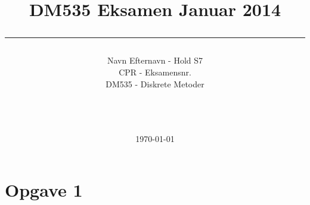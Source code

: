 \documentclass[a4paper,10pt]{article}
\title{DM535 Eksamen Januar 2014 \\ 
\rule{10cm}{0.5mm}}
\author{Navn Efternavn - Hold S7\\CPR - Eksamensnr.\\
DM535 - Diskrete Metoder\\\rule{5.5cm}{0.5mm}\\}
\date{\today}
\begin{document}
\maketitle

\vfill

\tableofcontents

\newpage
\section{Opgave 1}
\end{document}
